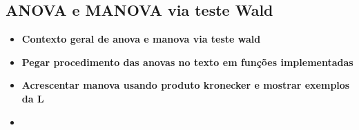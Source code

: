 \subsection{ANOVA e MANOVA via teste Wald}



\begin{itemize}
  \item \textbf{Contexto geral de anova e manova via teste wald}
  \item \textbf{Pegar procedimento das anovas no texto em funções implementadas}
  \item \textbf{Acrescentar manova usando produto kronecker e mostrar exemplos da L}
  \item \textbf{}
\end{itemize}

